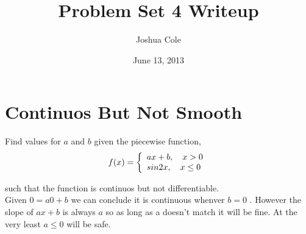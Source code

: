 \documentclass {article}
\begin{document}
\title {Problem Set 4 Writeup}
\author {Joshua Cole}
\date {June 13, 2013}
\maketitle
\section {Continuos But Not Smooth}

Find values for $a$ and $b$ given the piecewise function,
$$
f(x)=\left\{
\begin{array}{l l}
ax+b, \quad x > 0\\
sin2x, \quad x \leq 0
\end {array}
\right.$$

such that the function is continuos but not differentiable.\\

Given $0=a0+b$ we can conclude it is continuous whenver $b=0$ . However the slope of $ax+b$ is always $a$ so as long as a doesn't match it will be fine. At the very least $a \leq 0$ will be safe.
\end{document}
